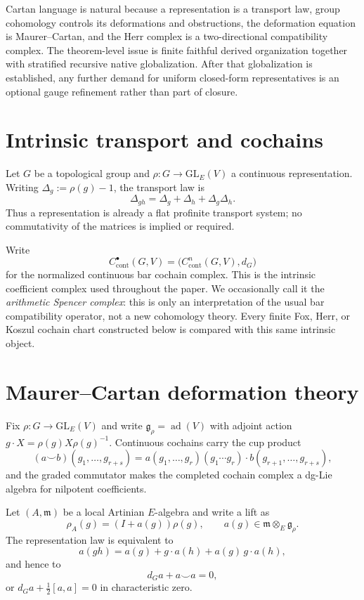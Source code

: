 \documentclass[11pt]{article}
\theoremstyle{definition}
\newcommand{\ad}{\operatorname{ad}}
\begin{document}
Cartan language is natural because a representation is a transport law, group cohomology controls its deformations and obstructions, the deformation equation is Maurer--Cartan, and the Herr complex is a two-directional compatibility complex.  The theorem-level issue is finite faithful derived organization together with stratified recursive native globalization.  After that globalization is established, any further demand for uniform closed-form representatives is an optional gauge refinement rather than part of closure.

\section{Intrinsic transport and cochains}

Let $G$ be a topological group and
$\rho:G\to\mathrm{GL}_E(V)$ a continuous representation.  Writing
$\Delta_g:=\rho(g)-1$, the transport law is
\[
 \Delta_{gh}=\Delta_g+\Delta_h+\Delta_g\Delta_h.
\]
Thus a representation is already a flat profinite transport system; no
commutativity of the matrices is implied or required.

Write
\[
 C^\bullet_{\mathrm{cont}}(G,V)
 =\bigl(C^n_{\mathrm{cont}}(G,V),d_G\bigr)
\]
for the normalized continuous bar cochain complex.  This is the intrinsic
coefficient complex used throughout the paper.  We occasionally call it the
\emph{arithmetic Spencer complex}: this is only an interpretation of the usual
bar compatibility operator, not a new cohomology theory.  Every finite Fox,
Herr, or Koszul cochain chart constructed below is compared with this same
intrinsic object.

\section{Maurer--Cartan deformation theory}\label{sec:deformation}

Fix $\rho:G\to\mathrm{GL}_E(V)$ and write $\mathfrak g_\rho=\ad(V)$ with adjoint action $g\cdot X=\rho(g)X\rho(g)^{-1}$.  Continuous cochains carry the cup product
\[
(a\smile b)(g_1,\dots,g_{r+s})
=a(g_1,\dots,g_r)(g_1\cdots g_r)\cdot b(g_{r+1},\dots,g_{r+s}),
\]
and the graded commutator makes the completed cochain complex a dg-Lie algebra for nilpotent coefficients.

Let $(A,\mathfrak m)$ be a local Artinian $E$-algebra and write a lift as
\[
\rho_A(g)=(I+a(g))\rho(g),
\qquad a(g)\in\mathfrak m\otimes_E\mathfrak g_\rho.
\]
The representation law is equivalent to
\begin{equation}\label{eq:nonlinear-cocycle}
a(gh)=a(g)+g\cdot a(h)+a(g)\,g\cdot a(h),
\end{equation}
and hence to
\begin{equation}\label{eq:MC}
d_Ga+a\smile a=0,
\end{equation}
or $d_Ga+\frac12[a,a]=0$ in characteristic zero.
\end{document}
